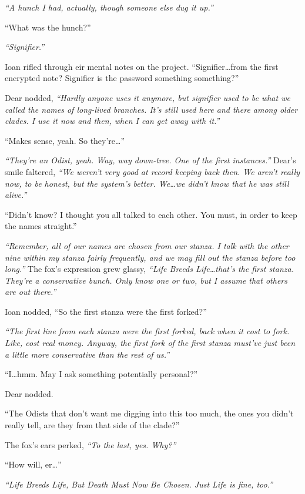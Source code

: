 \emph{``A hunch I had, actually, though someone else dug it up.''}

``What was the hunch?''

\emph{``Signifier.''}

Ioan rifled through eir mental notes on the project. ``Signifier\ldots{}from the first encrypted note? Signifier is the password something something?''

Dear nodded, \emph{``Hardly anyone uses it anymore, but signifier used to be what we called the names of long-lived branches. It's still used here and there among older clades. I use it now and then, when I can get away with it.''}

``Makes sense, yeah. So they're\ldots{}''

\emph{``They're an Odist, yeah. Way, way down-tree. One of the first instances.''} Dear's smile faltered, \emph{``We weren't very good at record keeping back then. We aren't really now, to be honest, but the system's better. We\ldots{}we didn't know that he was still alive.''}

``Didn't know? I thought you all talked to each other. You must, in order to keep the names straight.''

\emph{``Remember, all of our names are chosen from our stanza. I talk with the other nine within my stanza fairly frequently, and we may fill out the stanza before too long.''} The fox's expression grew glassy, \emph{``Life Breeds Life\ldots{}that's the first stanza. They're a conservative bunch. Only know one or two, but I assume that others are out there.''}

Ioan nodded, ``So the first stanza were the first forked?''

\emph{``The first line from each stanza were the first forked, back when it cost to fork. Like, cost real money. Anyway, the first fork of the first stanza must've just been a little more conservative than the rest of us.''}

``I\ldots{}hmm. May I ask something potentially personal?''

Dear nodded.

``The Odists that don't want me digging into this too much, the ones you didn't really tell, are they from that side of the clade?''

The fox's ears perked, \emph{``To the last, yes. Why?''}

``How will, er\ldots{}''

\emph{``Life Breeds Life, But Death Must Now Be Chosen. Just Life is fine, too.''}

